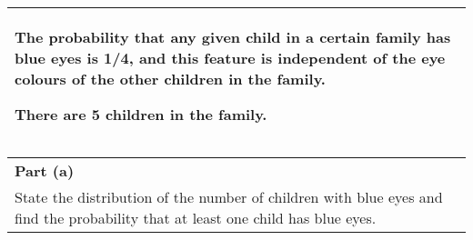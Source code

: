 \documentclass[a4paper,12pt]{article}
\begin{document}
\large

\begin{table}[ht!]
     \centering
     \begin{tabular}{|p{15cm}|}
     \hline     
     \large
 The probability that any given child in a certain family has blue eyes is 1/4, and this feature is independent of the eye colours of the other children in the family.  
 
There are 5 children in the family.
\\ \hline
      \end{tabular}
    \end{table}
    \medskip
    
\begin{table}[ht!]
     \centering
     \begin{tabular}{|p{15cm}|}
     \hline     
     \large    
\noindent \textbf{Part (a)}\\ 
\large
State the distribution of the number of children with blue eyes and find the probability that at least one child has blue eyes.


\\ \hline
      \end{tabular}
    \end{table}
\end{document}
